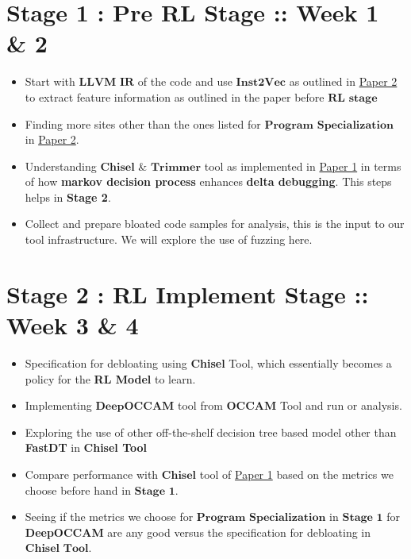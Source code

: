 \documentclass{article} %
\begin{document}
\section*{Stage 1 : Pre RL Stage :: Week 1 \& 2}
\begin{itemize}
    \item Start with $\textbf{LLVM IR}$ of the code and use $\textbf{Inst2Vec}$ as outlined in \href{http://www.csl.sri.com/users/gehani/papers/MLSys-2019.DeepOCCAM.pdf}{Paper 2} to extract feature information as outlined in the paper before $\textbf{RL stage}$
    \item Finding more sites other than the ones listed for $\textbf{Program Specialization}$ in \href{http://www.csl.sri.com/users/gehani/papers/MLSys-2019.DeepOCCAM.pdf}{Paper 2}.  
    \item Understanding $\textbf{Chisel}$ \& $\textbf{Trimmer}$ tool as implemented in \href{https://dl.acm.org/doi/10.1145/3243734.3243838}{Paper 1} in terms of how \textbf{markov decision process} enhances \textbf{delta debugging}. This steps helps in \textbf{Stage 2}.
    \item Collect and prepare bloated code samples for analysis, this is the input to our tool infrastructure. We will explore the use of fuzzing here.  
\end{itemize}

\section*{Stage 2 : RL Implement Stage :: Week 3 \& 4} 
\begin{itemize}
	\item Specification for debloating using \textbf{Chisel} Tool, which essentially becomes a policy for the \textbf{RL Model} to learn. 
    \item Implementing $\textbf{DeepOCCAM}$ tool from $\textbf{OCCAM}$ Tool and run or analysis. 
    \item Exploring the use of other off-the-shelf decision tree based model other than \textbf{FastDT} in \textbf{Chisel Tool} 
    \item Compare performance with $\textbf{Chisel}$ tool of \href{https://dl.acm.org/doi/10.1145/3243734.3243838}{Paper 1} based on the metrics we choose before hand in $\textbf{Stage 1}$. 
    \item Seeing if the metrics we choose for $\textbf{Program Specialization}$ in $\textbf{Stage 1}$ for \textbf{DeepOCCAM} are any good versus the specification for debloating in $\textbf{Chisel Tool}$.  
\end{itemize}
\end{document}
